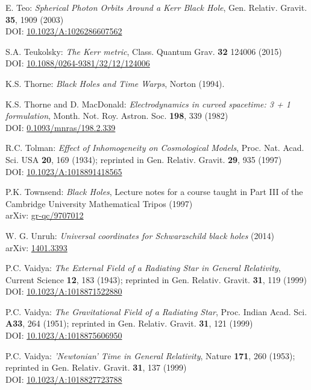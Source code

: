 \begin{thebibliography}{123}
E. Teo: {\em Spherical Photon Orbits Around a Kerr Black Hole},
Gen. Relativ. Gravit. {\bf 35}, 1909 (2003)\\
DOI: \href{https://doi.org/10.1023/A:1026286607562}{10.1023/A:1026286607562}

S.A. Teukolsky: {\em The Kerr metric},
Class. Quantum Grav. {\bf 32} 124006 (2015)\\
DOI: \href{https://doi.org/10.1088/0264-9381/32/12/124006}{10.1088/0264-9381/32/12/124006}

K.S. Thorne: {\em Black Holes and Time Warps}, Norton (1994).

K.S. Thorne and D. MacDonald: {\em Electrodynamics in curved spacetime: 3 + 1 formulation},
Month. Not. Roy. Astron. Soc. {\bf 198}, 339 (1982)\\
DOI: \href{https://doi.org/10.1093/mnras/198.2.339}{0.1093/mnras/198.2.339}

R.C. Tolman:
{\em Effect of Inhomogeneity on Cosmological Models},
Proc. Nat. Acad. Sci. USA {\bf 20}, 169 (1934);
reprinted in Gen. Relativ. Gravit. {\bf 29}, 935 (1997)\\
DOI: \href{https://doi.org/10.1023/A:1018891418565}{10.1023/A:1018891418565}

P.K. Townsend: {\em Black Holes}, Lecture notes for a course taught in Part III
of the Cambridge University Mathematical Tripos (1997) \\
arXiv: \href{https://arxiv.org/abs/gr-qc/9707012}{gr-qc/9707012}

W. G. Unruh: {\em Universal coordinates for Schwarzschild black holes} (2014)\\
arXiv: \href{https://arxiv.org/abs/1401.3393}{1401.3393}

P.C. Vaidya:
{\em The External Field of a Radiating Star in General Relativity},
Current Science {\bf 12}, 183 (1943);
reprinted in Gen. Relativ. Gravit. {\bf 31}, 119 (1999)\\
DOI: \href{https://doi.org/10.1023/A:1018871522880}{10.1023/A:1018871522880}

P.C. Vaidya:
{\em The Gravitational Field of a Radiating Star},
Proc. Indian Acad. Sci. {\bf A33}, 264 (1951);
reprinted in Gen. Relativ. Gravit. {\bf 31}, 121 (1999)\\
DOI: \href{https://doi.org/10.1023/A:1018875606950}{10.1023/A:1018875606950}

P.C. Vaidya:
{\em 'Newtonian' Time in General Relativity},
Nature {\bf 171}, 260 (1953);
reprinted in Gen. Relativ. Gravit. {\bf 31}, 137 (1999)\\
DOI: \href{https://doi.org/10.1023/A:1018827723788}{10.1023/A:1018827723788}


\end{thebibliography}

